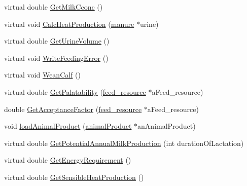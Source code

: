 \begin{DoxyCompactItemize}
virtual double \hyperlink{classcattle_a6301f605944f6071be0c63421353c375}{GetMilkCconc} ()
\item 
virtual void \hyperlink{classcattle_a684a6bc701b487ecb37887a81c72f52e}{CalcHeatProduction} (\hyperlink{classmanure}{manure} $\ast$urine)
\item 
virtual double \hyperlink{classcattle_add87f09e9b8ef0ed3ca7dcf9e4ac7172}{GetUrineVolume} ()
\item 
virtual void \hyperlink{classcattle_addc79a7896cb2c8207f26971cdd57d48}{WriteFeedingError} ()
\item 
virtual void \hyperlink{classcattle_a680668c3ea07844f0dce5193f2f85b69}{WeanCalf} ()
\item 
virtual double \hyperlink{classcattle_aeac6984f3aed6a1b0c37b609ffdbc02a}{GetPalatability} (\hyperlink{classfeed__resource}{feed\_\-resource} $\ast$aFeed\_\-resource)
\item 
double \hyperlink{classcattle_a532030c30439fc60896d2a6018b877ad}{GetAcceptanceFactor} (\hyperlink{classfeed__resource}{feed\_\-resource} $\ast$aFeed\_\-resource)
\item 
void \hyperlink{classcattle_a380c56c03be73c2b0bc0ce6f999a499e}{loadAnimalProduct} (\hyperlink{classanimal_product}{animalProduct} $\ast$anAnimalProduct)
\item 
virtual double \hyperlink{classcattle_a4de5ef9578b7f00f7fd0135001d2bf0f}{GetPotentialAnnualMilkProduction} (int durationOfLactation)
\item 
virtual double \hyperlink{classcattle_a8c3fee12050228b91b4f8a6aeeaae178}{GetEnergyRequirement} ()
\item 
virtual double \hyperlink{classcattle_a96d6a13910c586fc522ae1dbb11730d8}{GetSensibleHeatProduction} ()
\end{DoxyCompactItemize}
